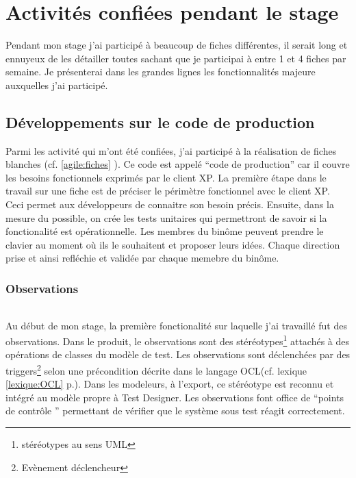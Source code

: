 \chapter{Activités confiées pendant le stage}
Pendant mon stage j'ai participé à beaucoup de fiches différentes, il serait long et ennuyeux de les détailler toutes sachant que je participai à entre 1 et 4 fiches par semaine. Je présenterai dans les grandes lignes les fonctionnalités majeure auxquelles j'ai participé.

\section{Développements sur le code de production}
Parmi les activité qui m'ont été confiées, j'ai participé à la réalisation de fiches blanches (cf. \ref{agile:fiches} \pageref{agile:fiches}). Ce code est appelé ``code de production'' car il couvre les besoins fonctionnels exprimés par le client XP. La première étape dans le travail sur une fiche est de préciser le périmètre fonctionnel avec le client XP. Ceci permet aux développeurs de connaitre son besoin précis. Ensuite, dans la mesure du possible, on crée les tests unitaires qui permettront de savoir si la fonctionalité est opérationnelle. Les membres du binôme peuvent prendre le clavier au moment où ils le souhaitent et proposer leurs idées. Chaque direction prise et ainsi refléchie et validée par chaque memebre du binôme.

\subsection{Observations}

\subparagraph*{}
Au début de mon stage, la première fonctionalité sur laquelle j'ai travaillé fut des observations. Dans le produit, le observations sont des stéréotypes\footnote{stéréotypes au sens UML} attachés à des opérations de classes du modèle de test. Les observations sont déclenchées par des triggers\footnote{Evènement déclencheur} selon une précondition décrite dans le langage OCL(cf. lexique \ref{lexique:OCL} p.\pageref{lexique:OCL}). Dans les modeleurs, à l'export, ce stéréotype est reconnu et intégré au modèle propre à Test Designer. Les observations font office de ``points de contrôle '' permettant de vérifier que le système sous test réagit correctement.


